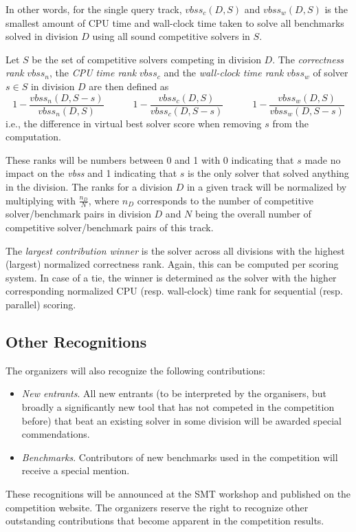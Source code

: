 \documentclass[12pt]{article}
\begin{document}
In other words, for the single query track,
$\mathit{vbss}_c(D,S)$  and $\mathit{vbss}_w(D,S)$ is the
smallest amount of CPU time and wall-clock time taken to solve all benchmarks
solved in division $D$ using all sound competitive solvers in $S$.

Let $S$ be the set of competitive solvers competing in division $D$.
The \emph{correctness rank} $\mathit{vbss}_n$, the \emph{CPU time rank}
$\mathit{vbss}_c$ and the \emph{wall-clock time rank} $\mathit{vbss}_w$
of solver $s \in S$ in division $D$ are then defined as
\[
1- \frac{\mathit{vbss}_n(D,S-s) }{ \mathit{vbss}_n (D,S)}
\hspace{3em}
1- \frac{\mathit{vbss}_c(D,S) }{ \mathit{vbss}_c(D,S-s)}
\hspace{3em}
1- \frac{\mathit{vbss}_w(D,S) }{ \mathit{vbss}_w(D,S-s)}
\]
i.e., the difference in virtual best solver score when removing $s$ from the
computation.

These ranks will be numbers between 0 and 1 with 0 indicating that $s$ made no
impact on the \emph{vbss} and 1 indicating that $s$ is the only solver that
solved anything in the division.
%
The ranks for a division $D$ in a given track will be normalized by multiplying
with $\frac{n_D}{N}$, where $n_D$ corresponds to the number of competitive
solver/benchmark pairs in division $D$ and $N$ being the overall number of
competitive solver/benchmark pairs of this track.

The \emph{largest contribution winner} is the solver across all divisions with
the highest (largest) normalized correctness rank. Again, this can be computed
per scoring system. In case of a tie, the winner is determined as the solver
with the higher corresponding normalized CPU (resp. wall-clock) time rank for
sequential (resp. parallel) scoring.

\subsection{Other Recognitions}

The organizers will also recognize the following contributions:
%
\begin{itemize}
\item \emph{New entrants}. All new entrants (to be interpreted by the organisers, but broadly a significantly new tool that has not competed in the competition before) that beat an existing solver in some division will be awarded special commendations.
\item \emph{Benchmarks}. Contributors of new benchmarks used in the competition will receive a special mention.
\end{itemize}
%
These recognitions will be announced at the SMT workshop and published on the competition website.
The organizers reserve the right to recognize other outstanding
contributions that become apparent in the competition results.
\end{document}
